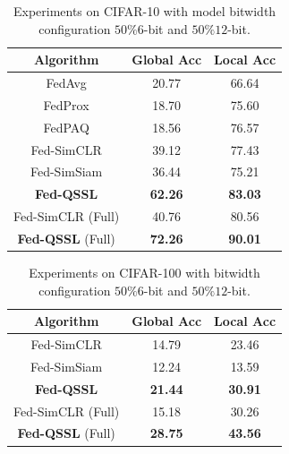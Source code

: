 \begin{table}[t]
\centering
\begin{tabular}{c|c|c}
    \hline
    Algorithm & Global Acc & Local Acc \\
    \hline
    FedAvg & 20.77 & 66.64  \\
    \hline
    FedProx & 18.70 & 75.60  \\
    \hline
    FedPAQ & 18.56 & 76.57 \\
    \hline
    Fed-SimCLR & 39.12 & 77.43  \\
    \hline
    Fed-SimSiam & 36.44 & 75.21 \\
    \hline
    \textbf{Fed-QSSL} & \textbf{62.26} & \textbf{83.03} \\
    \hline \hline
    Fed-SimCLR (Full) & 40.76 & 80.56 \\
    \hline
    \textbf{Fed-QSSL} (Full) & \textbf{72.26} & \textbf{90.01} \\
    \hline
\end{tabular}
\caption{Experiments on CIFAR-10 with model bitwidth configuration $50\% 6$-bit and $50\% 12$-bit.}
\label{table-2}
\end{table}

\begin{table}[t]
\centering
\begin{tabular}{c|c|c}
    \hline
    Algorithm & Global Acc & Local Acc \\
    \hline
    Fed-SimCLR & 14.79 & 23.46  \\
    \hline
    Fed-SimSiam & 12.24 & 13.59 \\
    \hline
    \textbf{Fed-QSSL} & \textbf{21.44} & \textbf{30.91} \\
    \hline \hline
    Fed-SimCLR (Full) & 15.18 & 30.26 \\
    \hline
    \textbf{Fed-QSSL} (Full) & \textbf{28.75} & \textbf{43.56} \\
    \hline
\end{tabular}
\caption{Experiments on CIFAR-100 with bitwidth configuration $50\% 6$-bit and $50\% 12$-bit.}
\label{table-3}
\end{table}


